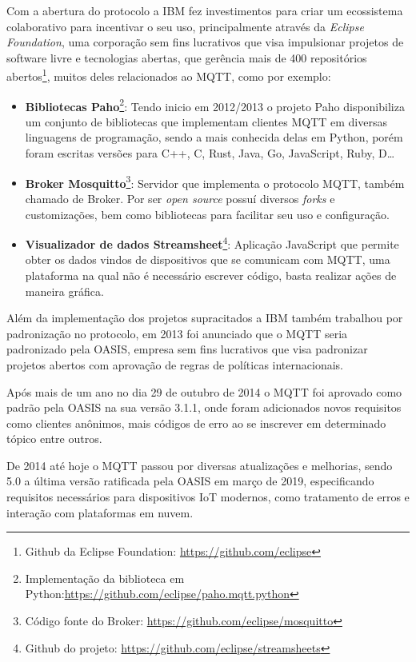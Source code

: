 \documentclass[12pt, a4paper]{article}
\begin{document}
Com a abertura do protocolo a IBM fez investimentos para criar um ecossistema colaborativo para incentivar o seu uso, principalmente através da \textit{Eclipse Foundation}, uma corporação sem fins lucrativos que visa impulsionar projetos de software livre e tecnologias abertas\cite{historia_eclipse_f}, que gerência mais de 400 repositórios abertos\footnote{Github da Eclipse Foundation: \url{https://github.com/eclipse}}, muitos deles relacionados ao MQTT, como por exemplo:
\begin{itemize}
    \item\textbf{Bibliotecas Paho}\footnote{Implementação da biblioteca em Python:\url{https://github.com/eclipse/paho.mqtt.python}}: Tendo inicio em 2012/2013 o projeto Paho disponibiliza um conjunto de bibliotecas que implementam clientes MQTT em diversas linguagens de programação, sendo a mais conhecida delas em Python, porém foram escritas versões para C++, C, Rust, Java, Go, JavaScript, Ruby, D\ldots
    \item\textbf{Broker Mosquitto}\footnote{Código fonte do Broker: \url{https://github.com/eclipse/mosquitto}}: Servidor que implementa o protocolo MQTT, também chamado de Broker. Por ser \textit{open source} possuí diversos \textit{forks} e customizações, bem como bibliotecas para facilitar seu uso e configuração.
    \item\textbf{Visualizador de dados Streamsheet}\footnote{Github do projeto: \url{https://github.com/eclipse/streamsheets}}: Aplicação JavaScript que permite obter os dados vindos de dispositivos que se comunicam com MQTT, uma plataforma na qual não é necessário escrever código, basta realizar ações de maneira gráfica.
\end{itemize}

Além da implementação dos projetos supracitados a IBM também trabalhou por padronização no protocolo, em 2013 foi anunciado que o MQTT seria padronizado pela OASIS\cite{historia_introduction_mqtt}, empresa sem fins lucrativos que visa padronizar projetos abertos com aprovação de regras de políticas internacionais\cite{historia_oasis}.

Após mais de um ano no dia 29 de outubro de 2014 o MQTT foi aprovado como padrão pela OASIS na sua versão 3.1.1, onde foram adicionados novos requisitos como clientes anônimos, mais códigos de erro ao se inscrever em determinado tópico entre outros.

De 2014 até hoje o MQTT passou por diversas atualizações e melhorias, sendo 5.0 a última versão ratificada pela OASIS em março de 2019\cite{historia_introduction_mqtt}, especificando requisitos necessários para dispositivos IoT modernos, como tratamento de erros e interação com plataformas em nuvem\cite{historia_introduction_mqtt}.
\end{document}
